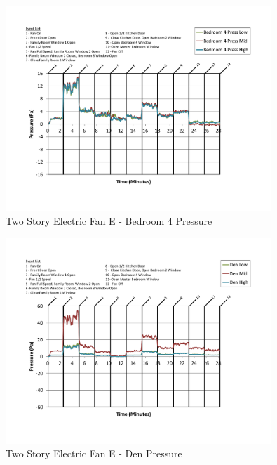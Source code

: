 \documentclass{article}
\begin{document}
\begin{appendices}
	\begin{figure}[H]
		\centering
		\includegraphics[height=3.05in,trim=0.67in 1.1in 0.67in 0.8in,clip=true]{0_Images/Results_Charts/ColdFlow/Two_Story/Electric/E/Bedroom_4_Pressure.pdf}
		\caption{Two Story Electric Fan E - Bedroom 4 Pressure}
	\end{figure}
 

	\begin{figure}[H]
		\centering
		\includegraphics[height=3.05in,trim=0.67in 1.1in 0.67in 0.8in,clip=true]{0_Images/Results_Charts/ColdFlow/Two_Story/Electric/E/Den_Pressure.pdf}
		\caption{Two Story Electric Fan E - Den Pressure}
	\end{figure}
 
	\clearpage


\end{appendices}
\end{document}
